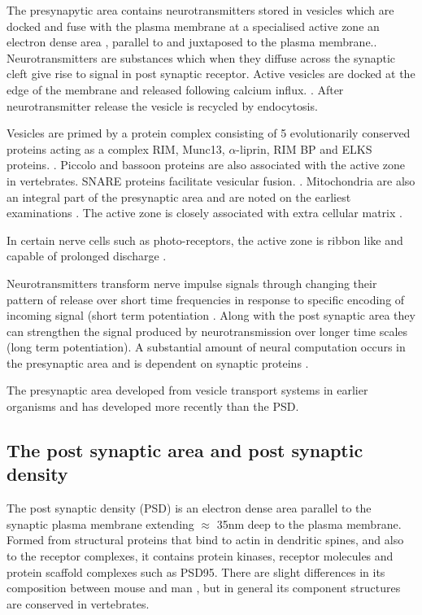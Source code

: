  The presynapytic area contains neurotransmitters stored in vesicles which are docked and fuse with the plasma membrane at a specialised active zone an electron dense area , parallel to and juxtaposed to the plasma membrane.\cite{schoch2006molecular}. Neurotransmitters are substances which when they diffuse across the synaptic cleft give rise to signal in post synaptic receptor. Active vesicles are docked at the edge of the membrane and released following calcium influx. \cite{lassek2015synaptic}. After neurotransmitter release the vesicle is recycled by endocytosis.\cite{ashery2014molecular}
 
 Vesicles are primed by a protein complex consisting of 5 evolutionarily  conserved proteins acting as a complex RIM, Munc13, $\alpha$-liprin, RIM BP and ELKS proteins. \cite{sudhof2012presynaptic}. Piccolo and bassoon proteins are also associated with the active zone in vertebrates.  SNARE proteins facilitate vesicular fusion. \cite{sudhof2012presynaptic}. Mitochondria \cite{lassek2014proteome} are also an integral part of the presynaptic area and are noted on the earliest examinations \cite{gray1959electron}. The active zone is closely associated with extra cellular matrix .
 
   In certain nerve cells such as photo-receptors, the active zone is ribbon like and capable of prolonged discharge  \cite{ashery2014molecular}.  
 
 Neurotransmitters transform nerve impulse signals through changing their pattern of release over short time frequencies in response to specific encoding of incoming signal (short term potentiation \cite{sudhof2012presynaptic}. Along with the post synaptic area they can strengthen the signal produced by neurotransmission over longer time scales (long term potentiation). A substantial amount of neural computation occurs in the presynaptic area and is dependent on synaptic proteins \cite{sudhof2012presynaptic}.
 
The presynaptic area developed from vesicle transport systems in earlier organisms and has developed more recently than the PSD.\cite{emes2012evolution}
 



\subsection{The post synaptic area and post synaptic density}

The post synaptic density (PSD) is an electron dense area parallel to the synaptic plasma membrane extending $\approx$ 35nm deep to the plasma membrane.\cite{harris2012ultrastructure} Formed from structural proteins that bind to actin in dendritic spines, and also to the receptor complexes, it contains protein kinases, receptor molecules and protein scaffold complexes such as PSD95. There are slight differences in its composition between mouse and man \cite{bayes2012comparative}, but in general its component structures are conserved in vertebrates.

